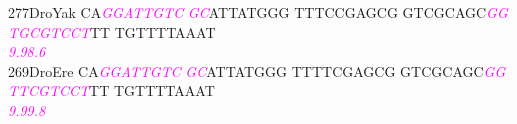 \documentclass[11pt,twoside,reqno,a4paper]{article}
\begin{document}
{277\hspace*{1\charwidth}DroYak	CA\textit{\textcolor{magenta}{G}}\textit{\textcolor{magenta}{G}}\textit{\textcolor{magenta}{A}}\textit{\textcolor{magenta}{T}}\textit{\textcolor{magenta}{T}}\textit{\textcolor{magenta}{G}}\textit{\textcolor{magenta}{T}}\textit{\textcolor{magenta}{C}}	\textit{\textcolor{magenta}{G}}\textit{\textcolor{magenta}{C}}ATTATGGG	TTTCCGAGCG	GTCGCAGC\textit{\textcolor{magenta}{G}}\textit{\textcolor{magenta}{G}}	\textit{\textcolor{magenta}{T}}\textit{\textcolor{magenta}{G}}\textit{\textcolor{magenta}{C}}\textit{\textcolor{magenta}{G}}\textit{\textcolor{magenta}{T}}\textit{\textcolor{magenta}{C}}\textit{\textcolor{magenta}{C}}\textit{\textcolor{magenta}{T}}TT	TGTTTTAAAT	\\
\hspace*{4\charwidth}\hspace*{7\charwidth}\hspace*{2\charwidth}\textit{\textcolor{magenta}{9.9}}\hspace*{1\charwidth}\hspace*{1\charwidth}\hspace*{1\charwidth}\hspace*{33\charwidth}\textit{\textcolor{magenta}{8.6}}\hspace*{1\charwidth}\hspace*{1\charwidth}\hspace*{1\charwidth}\\
269\hspace*{1\charwidth}DroEre	CA\textit{\textcolor{magenta}{G}}\textit{\textcolor{magenta}{G}}\textit{\textcolor{magenta}{A}}\textit{\textcolor{magenta}{T}}\textit{\textcolor{magenta}{T}}\textit{\textcolor{magenta}{G}}\textit{\textcolor{magenta}{T}}\textit{\textcolor{magenta}{C}}	\textit{\textcolor{magenta}{G}}\textit{\textcolor{magenta}{C}}ATTATGGG	TTTTCGAGCG	GTCGCAGC\textit{\textcolor{magenta}{G}}\textit{\textcolor{magenta}{G}}	\textit{\textcolor{magenta}{T}}\textit{\textcolor{magenta}{T}}\textit{\textcolor{magenta}{C}}\textit{\textcolor{magenta}{G}}\textit{\textcolor{magenta}{T}}\textit{\textcolor{magenta}{C}}\textit{\textcolor{magenta}{C}}\textit{\textcolor{magenta}{T}}TT	TGTTTTAAAT	\\
\hspace*{4\charwidth}\hspace*{7\charwidth}\hspace*{2\charwidth}\textit{\textcolor{magenta}{9.9}}\hspace*{1\charwidth}\hspace*{1\charwidth}\hspace*{1\charwidth}\hspace*{33\charwidth}\textit{\textcolor{magenta}{9.8}}\hspace*{1\charwidth}\hspace*{1\charwidth}\hspace*{1\charwidth}\\
}
\end{document}
